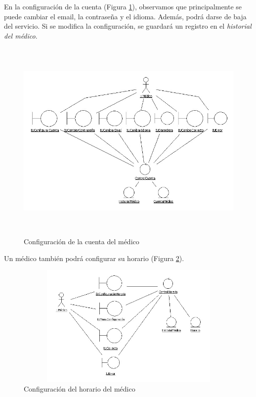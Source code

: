 	En la configuración de la cuenta (Figura \ref{fig:col_clase3}), observamos que principalmente se puede cambiar el email, la contraseña y el idioma. Además, podrá darse de baja del servicio. Si se modifica la configuración, se guardará un registro en el \textit{historial del médico}.
	\begin{figure}[H]
	  \centering
	    \includegraphics[width=16cm, height=10cm]{img/jpg/clases/3_MedicoConfiguracionCuenta.jpg}
	  \caption{Configuración de la cuenta del médico}
	  \label{fig:col_clase3}
	\end{figure}
	
	Un médico también podrá configurar su horario (Figura \ref{fig:col_clase4}).
	\begin{figure}[H]
	  \centering
	    \includegraphics[width=12cm, height=6cm]{img/jpg/clases/4_MedicoConfiguracionHorario.jpg}
	  \caption{Configuración del horario del médico}
	  \label{fig:col_clase4}
	\end{figure}

